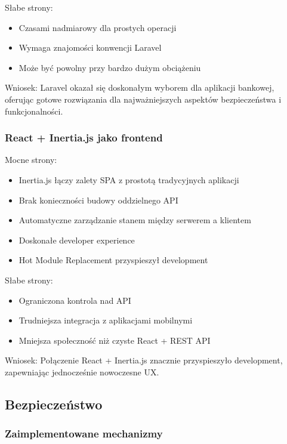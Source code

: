 \documentclass[12pt,a4paper]{article}
\begin{document}
    Słabe strony:
    \begin{itemize}
        \item Czasami nadmiarowy dla prostych operacji
        \item Wymaga znajomości konwencji Laravel
        \item Może być powolny przy bardzo dużym obciążeniu
    \end{itemize}

    Wniosek: Laravel okazał się doskonałym wyborem dla aplikacji bankowej, oferując gotowe rozwiązania dla najważniejszych aspektów bezpieczeństwa i funkcjonalności.

    \subsubsection{React + Inertia.js jako frontend}

    Mocne strony:
    \begin{itemize}
        \item Inertia.js łączy zalety SPA z prostotą tradycyjnych aplikacji
        \item Brak konieczności budowy oddzielnego API
        \item Automatyczne zarządzanie stanem między serwerem a klientem
        \item Doskonałe developer experience
        \item Hot Module Replacement przyspieszył development
    \end{itemize}

    Słabe strony:
    \begin{itemize}
        \item Ograniczona kontrola nad API
        \item Trudniejsza integracja z aplikacjami mobilnymi
        \item Mniejsza społeczność niż czyste React + REST API
    \end{itemize}

    Wniosek: Połączenie React + Inertia.js znacznie przyspieszyło development, zapewniając jednocześnie nowoczesne UX.

    \subsection{Bezpieczeństwo}

    \subsubsection{Zaimplementowane mechanizmy}
\end{document}
